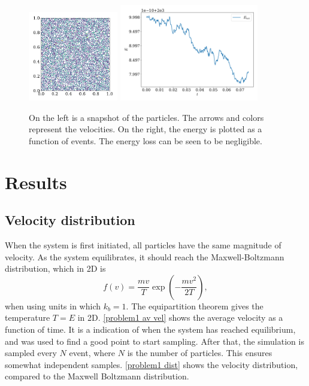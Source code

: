 \documentclass{article}
\begin{document}
    \begin{figure}[H]
        \centering
        \includegraphics[width=0.35\textwidth]{../plots/test_case_many_particles/test_case_many_particles.pdf}
        \includegraphics[width=0.54\textwidth]{../plots/test_case_many_particles/energy.pdf}
        \caption{On the left is a snapshot of the particles.
        The arrows and colors represent the velocities.
        On the right, the energy is plotted as a function of events.
        The energy loss can be seen to be negligible.}
        \label{test many particles}
    \end{figure}

    \section*{Results}
    \subsection*{Velocity distribution}

    When the system is first initiated, all particles have the same magnitude of velocity.
    As the system equilibrates, it should reach the Maxwell-Boltzmann distribution, which in 2D is
    \begin{equation*}
        f(v) = \frac{m v}{T} \exp \left(-\frac{m v^2}{2 T}\right),
    \end{equation*}
    when using units in which $k_b = 1$.
    The equipartition theorem gives the temperature $T = E$ in 2D.
    \autoref{problem1 av vel} shows the average velocity as a function of time.
    It is a indication of when the system has reached equilibrium, and was used to find a good point to start sampling.
    After that, the simulation is sampled every $N$ event, where $N$ is the number of particles.
    This ensures somewhat independent samples.
    \autoref{problem1 dist} shows the velocity distribution, compared to the Maxwell Boltzmann distribution.
\end{document}
